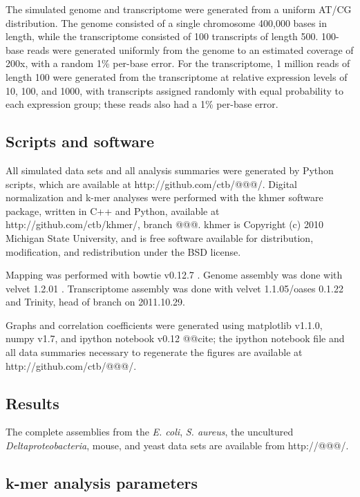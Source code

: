 \documentclass[10pt]{article}
\begin{document}
The simulated genome and transcriptome were generated from a uniform
AT/CG distribution.  The genome consisted of a single chromosome
400,000 bases in length, while the transcriptome consisted of 100
transcripts of length 500.  100-base reads were generated uniformly
from the genome to an estimated coverage of 200x, with a random 1\%
per-base error.  For the transcriptome, 1 million reads of length 100
were generated from the transcriptome at relative expression levels of
10, 100, and 1000, with transcripts assigned randomly with equal
probability to each expression group; these reads also had a 1\%
per-base error.

\subsection*{Scripts and software}

All simulated data sets and all analysis summaries were generated by
Python scripts, which are available at http://github.com/ctb/@@@/.
Digital normalization and k-mer analyses were performed with the khmer
software package, written in C++ and Python, available at
http://github.com/ctb/khmer/, branch @@@.  khmer is Copyright (c) 2010
Michigan State University, and is free software available for
distribution, modification, and redistribution under the BSD license.

Mapping was performed with bowtie v0.12.7 \cite{pubmed19261174}.
Genome assembly was done with velvet 1.2.01 \cite{pubmed18349386}.
Transcriptome assembly was done with velvet 1.1.05/oases 0.1.22 and
Trinity, head of branch on 2011.10.29.

Graphs and correlation coefficients were generated using matplotlib
v1.1.0, numpy v1.7, and ipython notebook v0.12 @@cite; the ipython
notebook file and all data summaries necessary to regenerate the
figures are available at http://github.com/ctb/@@@/.

\subsection*{Results}

The complete assemblies from the {\em E. coli}, {\em S. aureus}, the uncultured
{\em Deltaproteobacteria}, mouse, and yeast data sets are available from
http://@@@/.

\subsection*{k-mer analysis parameters}
\end{document}

